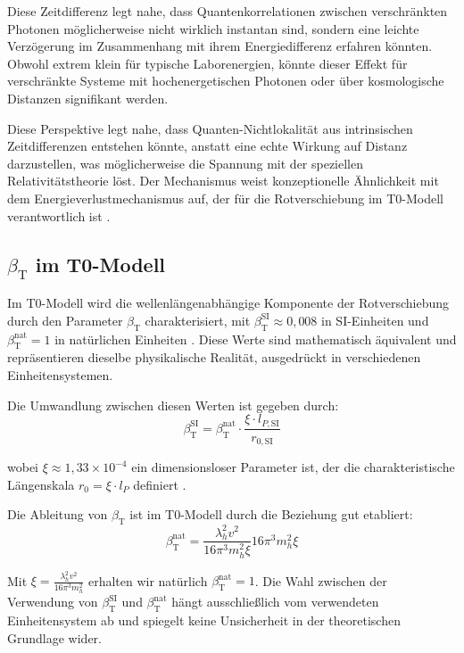 \documentclass[12pt,a4paper]{article}
\newcommand{\betaT}{\beta_{\text{T}}}
\begin{document}
	Diese Zeitdifferenz legt nahe, dass Quantenkorrelationen zwischen verschränkten Photonen möglicherweise nicht wirklich instantan sind, sondern eine leichte Verzögerung im Zusammenhang mit ihrem Energiedifferenz erfahren könnten. Obwohl extrem klein für typische Laborenergien, könnte dieser Effekt für verschränkte Systeme mit hochenergetischen Photonen oder über kosmologische Distanzen signifikant werden.
	
	Diese Perspektive legt nahe, dass Quanten-Nichtlokalität aus intrinsischen Zeitdifferenzen entstehen könnte, anstatt eine echte Wirkung auf Distanz darzustellen, was möglicherweise die Spannung mit der speziellen Relativitätstheorie löst. Der Mechanismus weist konzeptionelle Ähnlichkeit mit dem Energieverlustmechanismus auf, der für die Rotverschiebung im T0-Modell verantwortlich ist \cite{pascher_messdifferenzen_2025}.
	
	\subsection{\(\betaT\) im T0-Modell}
	Im T0-Modell wird die wellenlängenabhängige Komponente der Rotverschiebung durch den Parameter \(\betaT\) charakterisiert, mit \(\betaT^{\text{SI}} \approx 0,008\) in SI-Einheiten und \(\betaT^{\text{nat}} = 1\) in natürlichen Einheiten \cite{pascher_params_2025}. Diese Werte sind mathematisch äquivalent und repräsentieren dieselbe physikalische Realität, ausgedrückt in verschiedenen Einheitensystemen.
	
	Die Umwandlung zwischen diesen Werten ist gegeben durch:
	\begin{equation}
		\betaT^{\text{SI}} = \betaT^{\text{nat}} \cdot \frac{\xi \cdot l_{P,\text{SI}}}{r_{0,\text{SI}}}
	\end{equation}
	
	wobei \(\xi \approx 1,33 \times 10^{-4}\) ein dimensionsloser Parameter ist, der die charakteristische Längenskala \(r_0 = \xi \cdot l_P\) definiert \cite{pascher_temp_2025, pascher_alphabeta_2025}.
	
	Die Ableitung von \(\betaT\) ist im T0-Modell durch die Beziehung gut etabliert:
	\begin{equation}
		\betaT^{\text{nat}} = \frac{\lambda_h^2 v^2}{16\pi^3 m_h^2 \xi}{16\pi^3 m_h^2 \xi}
	\end{equation}
	
	Mit \(\xi = \frac{\lambda_h^2 v^2}{16\pi^3 m_h^2}\) erhalten wir natürlich \(\betaT^{\text{nat}} = 1\). Die Wahl zwischen der Verwendung von \(\betaT^{\text{SI}}\) und \(\betaT^{\text{nat}}\) hängt ausschließlich vom verwendeten Einheitensystem ab und spiegelt keine Unsicherheit in der theoretischen Grundlage wider.
	
\end{document}

